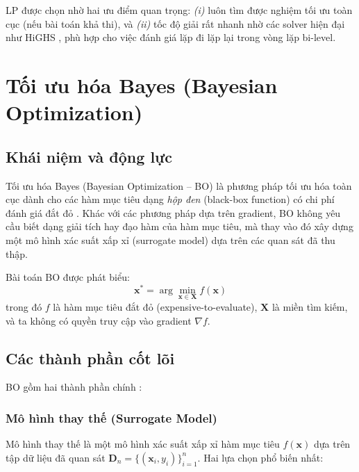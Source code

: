 LP được chọn nhờ hai ưu điểm quan trọng: \textit{(i)} luôn tìm được nghiệm tối ưu toàn cục (nếu bài toán khả thi), và \textit{(ii)} tốc độ giải rất nhanh nhờ các solver hiện đại như HiGHS \cite{huangfu2018highs}, phù hợp cho việc đánh giá lặp đi lặp lại trong vòng lặp bi-level.
\fi

\section{Tối ưu hóa Bayes (Bayesian Optimization)}

\subsection{Khái niệm và động lực}

Tối ưu hóa Bayes (Bayesian Optimization -- BO) là phương pháp tối ưu hóa toàn cục dành cho các hàm mục tiêu dạng \textit{hộp đen} (black-box function) có chi phí đánh giá đắt đỏ \cite{shahriari2016bo_survey}. Khác với các phương pháp dựa trên gradient, BO không yêu cầu biết dạng giải tích hay đạo hàm của hàm mục tiêu, mà thay vào đó xây dựng một mô hình xác suất xấp xỉ (surrogate model) dựa trên các quan sát đã thu thập.

Bài toán BO được phát biểu:
\begin{equation}
    \mathbf{x}^* = \arg\min_{\mathbf{x} \in \mathbf{X}} f(\mathbf{x})
    \label{eq:bo_problem}
\end{equation}
\noindent trong đó $f$ là hàm mục tiêu đắt đỏ (expensive-to-evaluate), $\mathbf{X}$ là miền tìm kiếm, và ta không có quyền truy cập vào gradient $\nabla f$.

\subsection{Các thành phần cốt lõi}

BO gồm hai thành phần chính \cite{frazier2018bo_tutorial}:

\subsubsection{Mô hình thay thế (Surrogate Model)}

Mô hình thay thế là một mô hình xác suất xấp xỉ hàm mục tiêu $f(\mathbf{x})$ dựa trên tập dữ liệu đã quan sát $\mathbf{D}_n = \{(\mathbf{x}_i, y_i)\}_{i=1}^n$. Hai lựa chọn phổ biến nhất:

